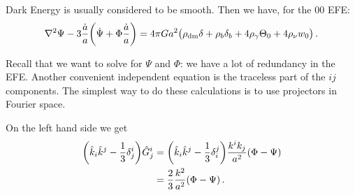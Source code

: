\documentclass[main.tex]{subfiles}
\begin{document}
Dark Energy is usually considered to be smooth. Then we have, for the 00 EFE: 
%
\begin{align} \label{eq:einstein-00-perturbed-equation}
\nabla^2 \Psi - 3 \frac{\dot{a}}{a} \qty(\dot{\Psi} + \Phi \frac{\dot{a}}{a }) = 4 \pi G a^2 \qty(
\rho_{\text{dm}} \delta + \rho_{b} \delta_{b} + 4 \rho_{\gamma } \Theta_0 + 4 \rho_{\nu } w_0 
)
\,.
\end{align}

Recall that we want to solve for \(\Psi \) and \(\Phi \): we have a lot of redundancy in the EFE. 
Another convenient independent equation is the traceless part of the \(ij\) components. 
The simplest way to do these calculations is to use projectors in Fourier space.

On the left hand side we get 
%
\begin{align}
\qty(\hat{k}_{i} \hat{k}^{j} - \frac{1}{3} \delta^{i}_{j}) \hat{G}^{i}_{j} &= \qty(\hat{k}_{i} \hat{k}^{j} - \frac{1}{3} \delta_{i}^{j}) 
\frac{k^{i}k_{j}}{a^2} \qty(\Phi - \Psi )  \\
&= \frac{2}{3} \frac{k^2}{a^2} \qty(\Phi- \Psi )
\,.
\end{align}
\end{document}
